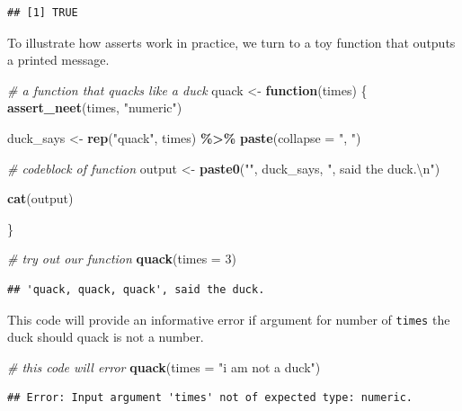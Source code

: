 \documentclass[
]{article}
\newenvironment{Shaded}{\begin{snugshade}}{\end{snugshade}}
\newcommand{\CharTok}[1]{\textcolor[rgb]{0.31,0.60,0.02}{#1}}
\newcommand{\CommentTok}[1]{\textcolor[rgb]{0.56,0.35,0.01}{\textit{#1}}}
\newcommand{\ControlFlowTok}[1]{\textcolor[rgb]{0.13,0.29,0.53}{\textbf{#1}}}
\newcommand{\DataTypeTok}[1]{\textcolor[rgb]{0.13,0.29,0.53}{#1}}
\newcommand{\DecValTok}[1]{\textcolor[rgb]{0.00,0.00,0.81}{#1}}
\newcommand{\KeywordTok}[1]{\textcolor[rgb]{0.13,0.29,0.53}{\textbf{#1}}}
\newcommand{\NormalTok}[1]{#1}
\newcommand{\OperatorTok}[1]{\textcolor[rgb]{0.81,0.36,0.00}{\textbf{#1}}}
\newcommand{\StringTok}[1]{\textcolor[rgb]{0.31,0.60,0.02}{#1}}
\begin{document}
\begin{verbatim}
## [1] TRUE
\end{verbatim}

To illustrate how asserts work in practice, we turn to a toy function that outputs a printed message.

\begin{Shaded}
\begin{Highlighting}[]
\CommentTok{\# a function that quacks like a duck}
\NormalTok{quack <{-}}\StringTok{ }\ControlFlowTok{function}\NormalTok{(times) \{}
  \KeywordTok{assert\_neet}\NormalTok{(times, }\StringTok{"numeric"}\NormalTok{)}
  
\NormalTok{  duck\_says <{-}}\StringTok{ }\KeywordTok{rep}\NormalTok{(}\StringTok{"quack"}\NormalTok{, times) }\OperatorTok{\%>\%}\StringTok{ }
\StringTok{    }\KeywordTok{paste}\NormalTok{(}\DataTypeTok{collapse =} \StringTok{", "}\NormalTok{)}
  
  \CommentTok{\# codeblock of function}
\NormalTok{  output <{-}}\StringTok{ }\KeywordTok{paste0}\NormalTok{(}\StringTok{"\textquotesingle{}"}\NormalTok{, duck\_says, }\StringTok{"\textquotesingle{}, said the duck.}\CharTok{\textbackslash{}n}\StringTok{"}\NormalTok{)}
  
  \KeywordTok{cat}\NormalTok{(output)}
  
\NormalTok{\}}

\CommentTok{\# try out our function}
\KeywordTok{quack}\NormalTok{(}\DataTypeTok{times =} \DecValTok{3}\NormalTok{)}
\end{Highlighting}
\end{Shaded}

\begin{verbatim}
## 'quack, quack, quack', said the duck.
\end{verbatim}

This code will provide an informative error if argument for number of \texttt{times} the duck should quack is not a number.

\begin{Shaded}
\begin{Highlighting}[]
\CommentTok{\# this code will error}
\KeywordTok{quack}\NormalTok{(}\DataTypeTok{times =} \StringTok{"i am not a duck"}\NormalTok{)}
\end{Highlighting}
\end{Shaded}

\begin{verbatim}
## Error: Input argument 'times' not of expected type: numeric.
\end{verbatim}
\end{document}
